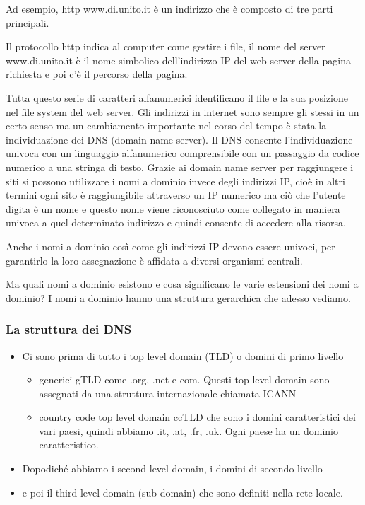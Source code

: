         Ad esempio, http www.di.unito.it è un indirizzo che è composto di tre parti principali.\par
        Il protocollo http indica al computer come gestire i file, il nome del server www.di.unito.it è il nome simbolico dell'indirizzo IP del web server della pagina richiesta e poi c'è il percorso della pagina.\par
        Tutta questo serie di caratteri alfanumerici identificano il file e la sua posizione nel file system del web server. Gli indirizzi in internet sono sempre gli stessi in un certo senso ma un cambiamento importante nel corso del tempo è stata la individuazione dei DNS (domain name server). Il DNS consente l'individuazione univoca con un linguaggio alfanumerico comprensibile con un passaggio da codice numerico a una stringa di testo. Grazie ai domain name server per raggiungere i siti si possono utilizzare i nomi a dominio invece degli indirizzi IP, cioè in altri termini ogni sito è raggiungibile attraverso un IP numerico ma ciò che l'utente digita è un nome e questo nome viene riconosciuto come collegato in maniera univoca a quel determinato indirizzo
        e quindi consente di accedere alla risorsa.\par
        
        Anche i nomi a dominio così come gli indirizzi IP devono essere univoci, per garantirlo la loro assegnazione è affidata a diversi organismi centrali.\par
        Ma quali nomi a dominio esistono e cosa significano le varie estensioni dei nomi a dominio? I nomi a dominio hanno una struttura gerarchica che adesso vediamo.
        
        \subsubsection{La struttura dei DNS}

        \begin{itemize}
            \item Ci sono prima di tutto i top level domain (TLD) o domini di primo livello
            \begin{itemize}
                \item generici gTLD come .org, .net e com. Questi top level domain sono assegnati da una struttura internazionale chiamata ICANN
                \item country code top level domain ccTLD che sono i domini caratteristici dei vari paesi, quindi abbiamo .it, .at, .fr, .uk. Ogni paese ha un dominio caratteristico.
            \end{itemize}
            \item Dopodiché abbiamo i second level domain, i domini di secondo livello
            \item e poi il third level domain  (sub domain) che sono definiti nella rete locale.
        \end{itemize}
        
